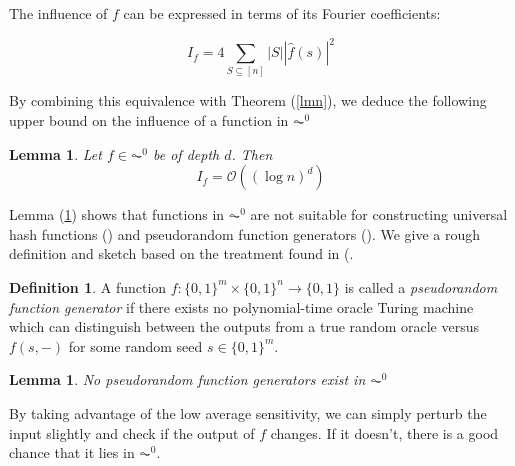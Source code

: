 \documentclass{amsart}
\newtheorem{lemma}[theorem]{Lemma}
\theoremstyle{definition}
\newtheorem{definition}[theorem]{Definition}
\theoremstyle{remark}
\numberwithin{equation}{section}
\theoremstyle{remark}
\begin{document}
\noindent The influence of $f$ can be expressed in terms of its Fourier coefficients:

\begin{equation}
  I_f = 4\sum_{S \subseteq [n]} |S||\hat{f}(s)|^2
\end{equation}

\noindent By combining this equivalence with Theorem (\ref{lmn}), we deduce the following upper bound on the influence of a function in $\AC^0$

\begin{lemma} \label{influence}
  Let $f \in \AC^0$ be of depth $d$. Then
  \begin{equation}
    I_f = \mathcal{O}((\log n)^d)
  \end{equation}
\end{lemma}

\noindent Lemma (\ref{influence}) shows that functions in $\AC^0$  are not suitable for constructing universal hash functions (\cite{mansour}) and pseudorandom function generators (\cite{lmn}). We give a rough definition and sketch based on the treatment found in (\cite{lmn}.

\begin{definition}
  A function $f:\{0,1\}^m \times \{0,1\}^n \rightarrow \{0,1\}$ is called a \emph{pseudorandom function generator} if there exists no polynomial-time oracle Turing machine which can distinguish between the outputs from a true random oracle versus $f(s,-)$ for some random seed $s \in \{0,1\}^m$.
\end{definition}

\begin{lemma}
  No pseudorandom function generators exist in $\AC^0$
\end{lemma}
\noindent By taking advantage of the low average sensitivity, we can simply perturb the input slightly and check if the output of $f$ changes. If it doesn't, there is a good chance that
it lies in $\AC^0$.
\end{document}
